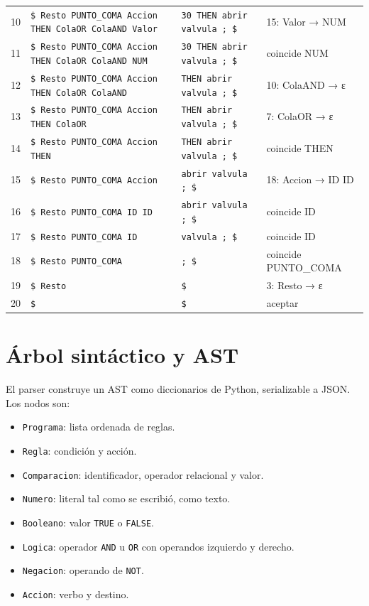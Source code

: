\documentclass[11pt,a4paper]{article}
\newcommand{\tk}[1]{\texttt{#1}}
\begin{document}
\begin{xltabular}{\textwidth}{r Y{1.3} Y{0.9} Y{0.8}}
  10 & \texttt{\$ Resto PUNTO\_\allowbreak{}COMA Accion THEN
  ColaOR ColaAND Valor} & \texttt{30 THEN abrir valvula ; \$} &
  15: Valor → NUM \\
  11 & \texttt{\$ Resto PUNTO\_\allowbreak{}COMA Accion THEN
  ColaOR ColaAND NUM} & \texttt{30 THEN abrir valvula ; \$} &
  coincide NUM \\
  12 & \texttt{\$ Resto PUNTO\_\allowbreak{}COMA Accion THEN
  ColaOR ColaAND} & \texttt{THEN abrir valvula ; \$} & 10: ColaAND → ε \\
  13 & \texttt{\$ Resto PUNTO\_\allowbreak{}COMA Accion THEN
  ColaOR} & \texttt{THEN abrir valvula ; \$} & 7: ColaOR → ε \\
  14 & \texttt{\$ Resto PUNTO\_\allowbreak{}COMA Accion THEN} &
  \texttt{THEN abrir valvula ; \$} & coincide THEN \\
  15 & \texttt{\$ Resto PUNTO\_\allowbreak{}COMA Accion} &
  \texttt{abrir valvula ; \$} & 18: Accion → ID ID \\
  16 & \texttt{\$ Resto PUNTO\_\allowbreak{}COMA ID ID} &
  \texttt{abrir valvula ; \$} & coincide ID \\
  17 & \texttt{\$ Resto PUNTO\_\allowbreak{}COMA ID} &
  \texttt{valvula ; \$} & coincide ID \\
  18 & \texttt{\$ Resto PUNTO\_\allowbreak{}COMA} & \texttt{; \$}
  & coincide PUNTO\_COMA \\
  19 & \texttt{\$ Resto} & \texttt{\$} & 3: Resto → ε \\
  20 & \texttt{\$} & \texttt{\$} & aceptar \\
  \bottomrule
\end{xltabular}
\endgroup

\section{Árbol sintáctico y AST}

El parser construye un AST como diccionarios de Python,
serializable a JSON. Los nodos son:

\begin{itemize}
  \item \texttt{Programa}: lista ordenada de reglas.
  \item \texttt{Regla}: condición y acción.
  \item \texttt{Comparacion}: identificador, operador relacional y valor.
  \item \texttt{Numero}: literal tal como se escribió, como texto.
  \item \texttt{Booleano}: valor \tk{TRUE} o \tk{FALSE}.
  \item \texttt{Logica}: operador \tk{AND} u \tk{OR} con operandos
    izquierdo y derecho.
  \item \texttt{Negacion}: operando de \tk{NOT}.
  \item \texttt{Accion}: verbo y destino.
\end{itemize}
\end{document}
